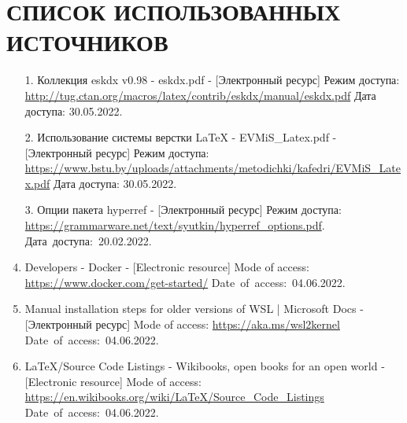 \documentclass[
    12pt, %
    a4paper, %
    simple, %
    floatsection %
]{eskdtext}
\begin{document}
\newpage
{}
\section*{СПИСОК ИСПОЛЬЗОВАННЫХ ИСТОЧНИКОВ}
\begin{enumerate}
    \item[1.] Коллекция eskdx v0.98 - eskdx.pdf
    - [Электронный ресурс]
    Режим доступа: \url{http://tug.ctan.org/macros/latex/contrib/eskdx/manual/eskdx.pdf}
    Дата доступа: 30.05.2022.

    \item[2.] Использование системы верстки LaTeX - EVMiS\_Latex.pdf
    - [Электронный ресурс]
    Режим доступа: \url{https://www.bstu.by/uploads/attachments/metodichki/kafedri/EVMiS_Latex.pdf}
    Дата доступа: 30.05.2022.

    \item[3.] Опции пакета hyperref
    - [Электронный ресурс]
    Режим доступа: \url{https://grammarware.net/text/syutkin/hyperref_options.pdf}.
    Дата~доступа:~20.02.2022.

    \item Developers - Docker
    - [Electronic resource]
    Mode of access: \url{https://www.docker.com/get-started/}
    Date~of~access:~04.06.2022.

    \item Manual installation steps for older versions of WSL | Microsoft Docs
    - [Электронный ресурс]
    Mode of access: \url{https://aka.ms/wsl2kernel}
    Date~of~access:~04.06.2022.

    \item LaTeX/Source Code Listings - Wikibooks, open books for an open world
    - [Electronic resource]
    Mode of access: \url{https://en.wikibooks.org/wiki/LaTeX/Source_Code_Listings}
    Date~of~access:~04.06.2022.
\end{enumerate}


\newpage
\end{document}
